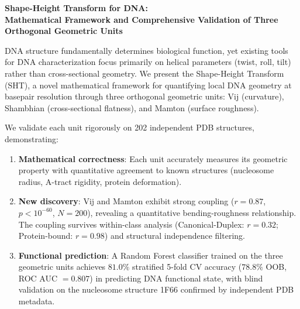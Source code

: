 
\vspace*{2cm}

\begin{center}
\textbf{Shape-Height Transform for DNA: \\[0.3cm] Mathematical Framework and Comprehensive Validation of Three Orthogonal Geometric Units}
\end{center}

\vspace{1cm}

DNA structure fundamentally determines biological function, yet existing tools for DNA characterization focus primarily on helical parameters (twist, roll, tilt) rather than cross-sectional geometry. We present the Shape-Height Transform (SHT), a novel mathematical framework for quantifying local DNA geometry at basepair resolution through three orthogonal geometric units: Vij (curvature), Shambhian (cross-sectional flatness), and Mamton (surface roughness).

\vspace{0.5cm}

We validate each unit rigorously on 202 independent PDB structures, demonstrating:
\begin{enumerate}
    \item \textbf{Mathematical correctness}: Each unit accurately measures its geometric property with quantitative agreement to known structures (nucleosome radius, A-tract rigidity, protein deformation).
    
    \item \textbf{New discovery}: Vij and Mamton exhibit strong coupling ($r = 0.87$, $p < 10^{-60}$, $N=200$), revealing a quantitative bending-roughness relationship. The coupling survives within-class analysis (Canonical-Duplex: $r=0.32$; Protein-bound: $r=0.98$) and structural independence filtering.
    
    \item \textbf{Functional prediction}: A Random Forest classifier trained on the three geometric units achieves $81.0\%$ stratified 5-fold CV accuracy ($78.8\%$ OOB, ROC AUC $= 0.807$) in predicting DNA functional state, with blind validation on the nucleosome structure 1F66 confirmed by independent PDB metadata.
\end{enumerate}

